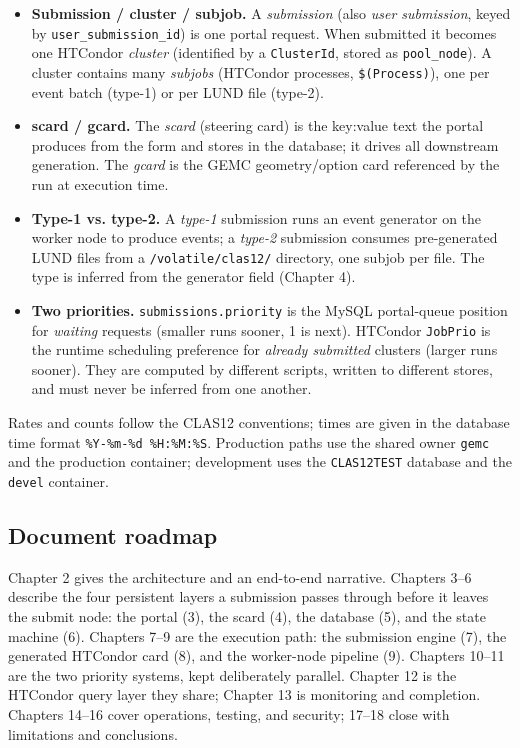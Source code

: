 \begin{itemize}
  \item \textbf{Submission / cluster / subjob.} A \textit{submission} (also \textit{user submission}, keyed by \texttt{user\_\allowbreak{}submission\_\allowbreak{}id}) is one portal request. When submitted it becomes one HTCondor \textit{cluster} (identified by a \texttt{ClusterId}, stored as \texttt{pool\_\allowbreak{}node}). A cluster contains many \textit{subjobs} (HTCondor processes, \texttt{\$(Process)}), one per event batch (type-1) or per LUND file (type-2).
  \item \textbf{scard / gcard.} The \textit{scard} (steering card) is the key:value text the portal produces from the form and stores in the database; it drives all downstream generation. The \textit{gcard} is the GEMC geometry/option card referenced by the run at execution time.
  \item \textbf{Type-1 vs. type-2.} A \textit{type-1} submission runs an event generator on the worker node to produce events; a \textit{type-2} submission consumes pre-generated LUND files from a \texttt{/\allowbreak{}volatile/\allowbreak{}clas12/\allowbreak{}} directory, one subjob per file. The type is inferred from the generator field (Chapter 4).
  \item \textbf{Two priorities.} \texttt{submissions.\allowbreak{}priority} is the MySQL portal-queue position for \textit{waiting} requests (smaller runs sooner, 1 is next). HTCondor \texttt{JobPrio} is the runtime scheduling preference for \textit{already submitted} clusters (larger runs sooner). They are computed by different scripts, written to different stores, and must never be inferred from one another.
\end{itemize}

Rates and counts follow the CLAS12 conventions; times are given in the database time format \texttt{\%Y-\allowbreak{}\%m-\allowbreak{}\%d \%H:\allowbreak{}\%M:\allowbreak{}\%S}. Production paths use the shared owner \texttt{gemc} and the production container; development uses the \texttt{CLAS12TEST} database and the \texttt{devel} container.

\subsection{Document roadmap}

Chapter 2 gives the architecture and an end-to-end narrative. Chapters 3--6 describe the four persistent layers a submission passes through before it leaves the submit node: the portal (3), the scard (4), the database (5), and the state machine (6). Chapters 7--9 are the execution path: the submission engine (7), the generated HTCondor card (8), and the worker-node pipeline (9). Chapters 10--11 are the two priority systems, kept deliberately parallel. Chapter 12 is the HTCondor query layer they share; Chapter 13 is monitoring and completion. Chapters 14--16 cover operations, testing, and security; 17--18 close with limitations and conclusions.
